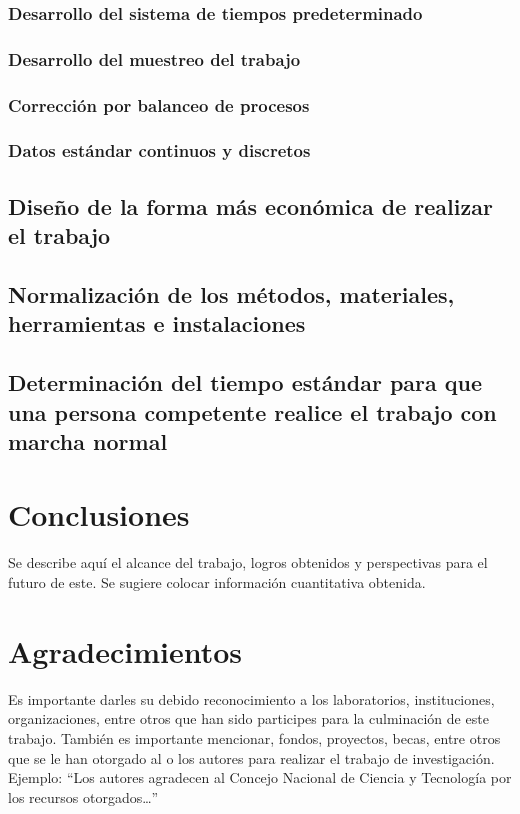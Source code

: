     \subsubsection{Desarrollo del sistema de tiempos predeterminado}
    \subsubsection{Desarrollo del muestreo del trabajo}
    \subsubsection{Corrección por balanceo de procesos}
    \subsubsection{Datos estándar continuos y discretos}
    \subsection{Diseño de la forma más económica de realizar el trabajo}
    
    \subsection{Normalización de los métodos, materiales, herramientas e instalaciones}
    \subsection{Determinación del tiempo estándar para que una persona competente realice el trabajo con marcha normal}
    
    
    \section{Conclusiones}
    
    Se describe aquí el alcance del trabajo, logros obtenidos y perspectivas para el futuro de este. Se sugiere colocar información cuantitativa obtenida.
    
    \section{Agradecimientos}
    
    Es importante darles su debido reconocimiento a los laboratorios, instituciones, organizaciones, entre otros que han sido participes para la culminación de este trabajo. También es importante mencionar, fondos, proyectos, becas, entre otros que se le han otorgado al o los autores para realizar el trabajo de investigación. Ejemplo: “Los autores agradecen al Concejo Nacional de Ciencia y Tecnología por los recursos otorgados…”
    
